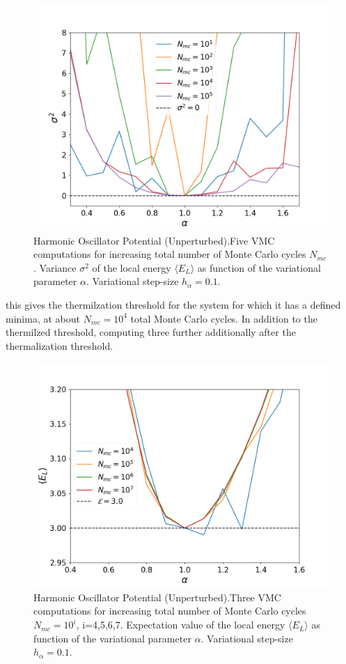 \documentclass[aip,nobalancelastpage,
twocolumn,
rsi,%
 amsmath,amssymb,
 reprint,%
]{revtex4}
\begin{document}
\begin{figure}[H]
\center
\includegraphics[scale=0.33]{figsPartI/IStabilitySigma.png}
\caption{Harmonic Oscillator Potential (Unperturbed).\newline Five VMC computations for increasing total number of Monte Carlo cycles $N_{mc}$. Variance $\sigma^2$ of the local energy $\langle E_L \rangle$ as function of the variational parameter $\alpha$. Variational step-size $h_\alpha = 0.1$.}
\label{Ifig2}
\end{figure}

this gives the thermilzation threshold for the system for which it has a defined minima, at about $N_{mc}=10^4$ total Monte Carlo cycles.
In addition to the thermilzed threshold, computing three further additionally after the thermalization threshold. \par

\begin{figure}[H]
\center
\includegraphics[scale=0.33]{figsPartI/IStabilityThermalizedE.png}
\caption{Harmonic Oscillator Potential (Unperturbed).\newline Three VMC computations for increasing total number of Monte Carlo cycles $N_{mc}=10^i$, i=4,5,6,7. Expectation value of the local energy $\langle E_L \rangle$ as function of the variational parameter $\alpha$. Variational step-size $h_\alpha = 0.1$.}
\label{Ifig3}
\end{figure}
\end{document}
